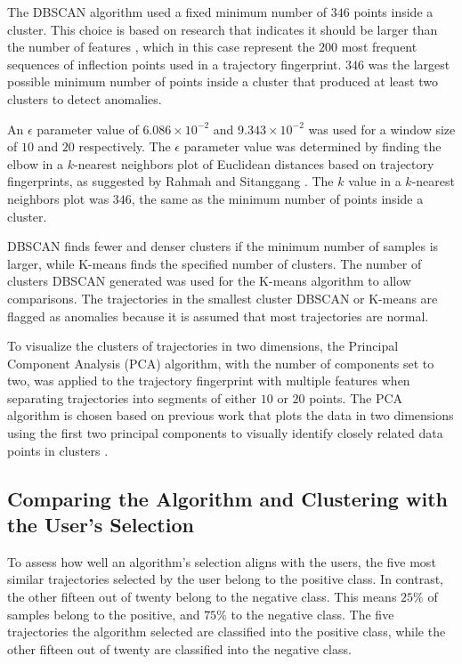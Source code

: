 \documentclass[preprint,12pt]{elsarticle}
\begin{document}
The DBSCAN algorithm used a fixed minimum number of $346$ points inside a cluster. This choice is based on research that indicates it should be larger than the number of features \cite{Ester1996ADA}, which in this case represent the $200$ most frequent sequences of inflection points used in a trajectory fingerprint. $346$ was the largest possible minimum number of points inside a cluster that produced at least two clusters to detect anomalies.

An $\epsilon$ parameter value of $6.086 \times 10^{-2}$ and $9.343 \times 10^{-2}$ was used for a window size of $10$ and $20$ respectively. The $\epsilon$ parameter value was determined by finding the elbow in a $k$-nearest neighbors plot of Euclidean distances based on trajectory fingerprints, as suggested by Rahmah and Sitanggang \cite{rahmah2016determination}. The $k$ value in a $k$-nearest neighbors plot was $346$, the same as the minimum number of points inside a cluster.

DBSCAN finds fewer and denser clusters if the minimum number of samples is larger, while K-means finds the specified number of clusters. The number of clusters DBSCAN generated was used for the K-means algorithm to allow comparisons. The trajectories in the smallest cluster DBSCAN or K-means are flagged as anomalies because it is assumed that most trajectories are normal.

To visualize the clusters of trajectories in two dimensions, the Principal Component Analysis (PCA) algorithm, with the number of components set to two, was applied to the trajectory fingerprint with multiple features when separating trajectories into segments of either $10$ or $20$ points. The PCA algorithm is chosen based on previous work that plots the data in two dimensions using the first two principal components to visually identify closely related data points in clusters \cite{jolliffe2016principal}.

\subsection{Comparing the Algorithm and Clustering with the User's Selection}

To assess how well an algorithm's selection aligns with the users, the five most similar trajectories selected by the user belong to the positive class. In contrast, the other fifteen out of twenty belong to the negative class. This means $25\%$ of samples belong to the positive, and $75\%$ to the negative class. The five trajectories the algorithm selected are classified into the positive class, while the other fifteen out of twenty are classified into the negative class.
\end{document}
